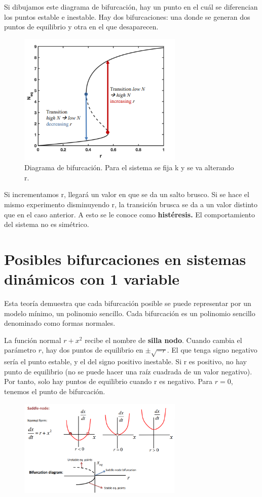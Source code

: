 Si dibujamos este diagrama de bifurcación, hay un punto en el cuál se diferencian los puntos estable e inestable. Hay dos bifurcaciones: una donde se generan dos puntos de equilibrio y otra en el que desaparecen.

\begin{figure}[h]
\centering
\includegraphics[width = 0.7\textwidth]{figs/bifurcation-diagram-log.png}
\caption{Diagrama de bifurcación. Para el sistema se fija k y se va alterando r. }
\end{figure}

Si incrementamos r, llegará un valor en que se da un salto brusco. Si se hace el mismo experimento disminuyendo r, la transición brusca se da a un valor distinto que en el caso anterior. A esto se le conoce como \textbf{histéresis.} El comportamiento del sistema no es simétrico. 

\section{Posibles bifurcaciones en sistemas dinámicos con 1 variable}
Esta teoría demuestra que cada bifurcación posible se puede representar por un modelo mínimo, un polinomio sencillo. Cada bifurcación es un polinomio sencillo denominado como formas normales.

La función normal $r + x^2$ recibe el nombre de \textbf{silla nodo}. Cuando cambia el parámetro $r$, hay dos puntos de equilibrio en $\pm \sqrt{-r}$. El que tenga signo negativo sería el punto estable, y el del signo positivo inestable. Si r es positivo, no hay punto de equilibrio (no se puede hacer una raíz cuadrada de un valor negativo). Por tanto, solo hay puntos de equilibrio cuando r es negativo. Para $r = 0$, tenemos el punto de bifurcación. 

\begin{figure}[h]
\centering
\includegraphics[width = 0.7\textwidth]{figs/saddle-node.png}
\end{figure}


